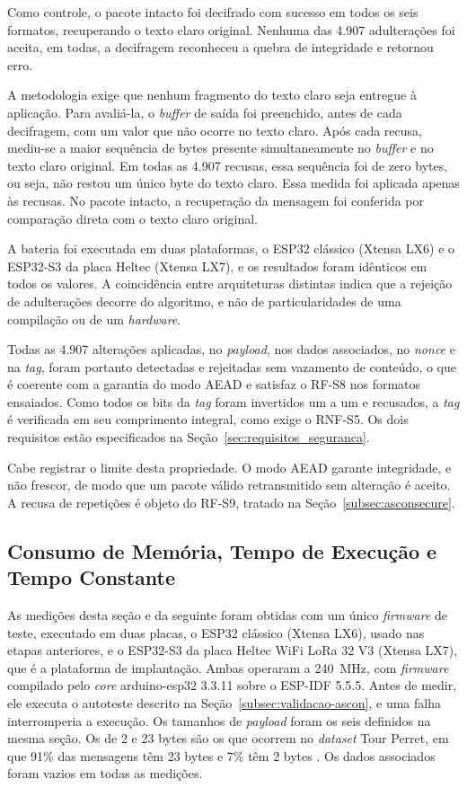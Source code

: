 Como controle, o pacote intacto foi decifrado com sucesso em todos os seis formatos, recuperando o texto claro original. Nenhuma das 4.907 adulterações foi aceita, em todas, a decifragem reconheceu a quebra de integridade e retornou erro.

A metodologia exige que nenhum fragmento do texto claro seja entregue à aplicação. Para avaliá-la, o \textit{buffer} de saída foi preenchido, antes de cada decifragem, com um valor que não ocorre no texto claro. Após cada recusa, mediu-se a maior sequência de bytes presente simultaneamente no \textit{buffer} e no texto claro original. Em todas as 4.907 recusas, essa sequência foi de zero bytes, ou seja, não restou um único byte do texto claro. Essa medida foi aplicada apenas às recusas. No pacote intacto, a recuperação da mensagem foi conferida por comparação direta com o texto claro original.

A bateria foi executada em duas plataformas, o ESP32 clássico (Xtensa LX6) e o ESP32-S3 da placa Heltec (Xtensa LX7), e os resultados foram idênticos em todos os valores. A coincidência entre arquiteturas distintas indica que a rejeição de adulterações decorre do algoritmo, e não de particularidades de uma compilação ou de um \textit{hardware}.

Todas as 4.907 alterações aplicadas, no \textit{payload}, nos dados associados, no \textit{nonce} e na \textit{tag}, foram portanto detectadas e rejeitadas sem vazamento de conteúdo, o que é coerente com a garantia do modo AEAD e satisfaz o RF-S8 nos formatos ensaiados. Como todos os bits da \textit{tag} foram invertidos um a um e recusados, a \textit{tag} é verificada em seu comprimento integral, como exige o RNF-S5. Os dois requisitos estão especificados na Seção~\ref{sec:requisitos_seguranca}.

Cabe registrar o limite desta propriedade. O modo AEAD garante integridade, e não frescor, de modo que um pacote válido retransmitido sem alteração é aceito. A recusa de repetições é objeto do RF-S9, tratado na Seção~\ref{subsec:asconsecure}.


\subsection{Consumo de Memória, Tempo de Execução e Tempo Constante}
\label{subsec:memoria_tempo}

As medições desta seção e da seguinte foram obtidas com um único \textit{firmware} de teste, executado em duas placas, o ESP32 clássico (Xtensa LX6), usado nas etapas anteriores, e o ESP32-S3 da placa Heltec WiFi LoRa 32 V3 (Xtensa LX7), que é a plataforma de implantação. Ambas operaram a 240~MHz, com \textit{firmware} compilado pelo \textit{core} arduino-esp32 3.3.11 sobre o ESP-IDF 5.5.5. Antes de medir, ele executa o autoteste descrito na Seção~\ref{subsec:validacao-ascon}, e uma falha interromperia a execução. Os tamanhos de \textit{payload} foram os seis definidos na mesma seção. Os de 2 e 23 bytes são os que ocorrem no \textit{dataset} Tour Perret, em que 91\% das mensagens têm 23 bytes e 7\% têm 2 bytes \cite{tourperret_dataset}. Os dados associados foram vazios em todas as medições.

